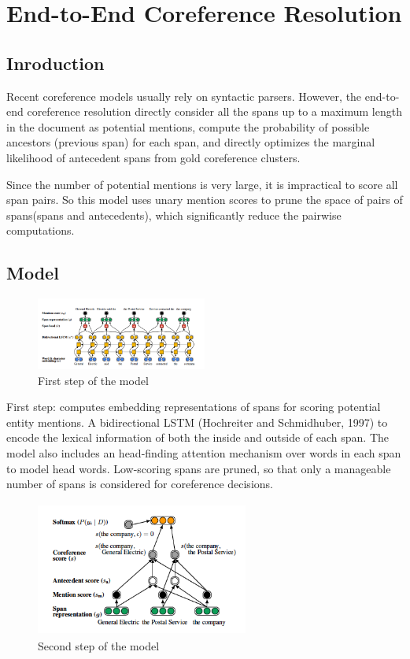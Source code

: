 \documentclass[11pt]{article}
\begin{document}
\section{End-to-End Coreference Resolution}

\subsection{Inroduction}
Recent coreference models usually rely on syntactic parsers. However, the end-to-end coreference resolution directly consider all the spans up to a maximum length in the document as potential mentions,  compute the probability of possible ancestors (previous span) for each span, and directly optimizes the marginal likelihood of antecedent spans from gold coreference clusters.

Since the number of potential mentions is very large, it is impractical to score all span pairs. So this model uses unary mention scores to prune the space of pairs of spans(spans and antecedents), which significantly reduce the pairwise computations.

\subsection{Model}

\begin{figure}[h]
                
 \includegraphics[width=0.5\textwidth]{02.jpg}
 \caption{First step of the model}
                
\end{figure}

First step:  computes embedding representations of spans for scoring potential entity mentions.
A  bidirectional LSTM (Hochreiter and Schmidhuber, 1997) to encode the lexical information of both the inside and outside of each span. The model also includes an head-finding attention mechanism over words in each span to model head words.
Low-scoring spans are pruned, so that only a manageable number of spans is considered for coreference decisions.

\begin{figure}[h]                
 \includegraphics[width=2.75in,height=1.75in]{03.jpg}
 \caption{Second step of the model}             
\end{figure}
\end{document}
